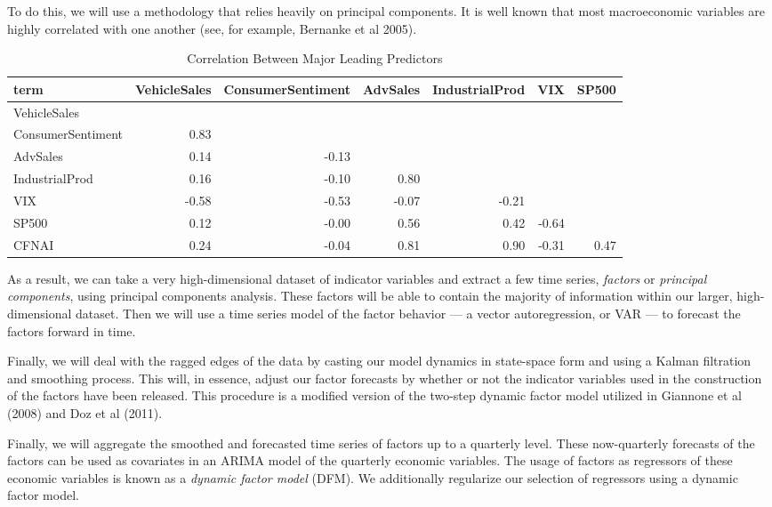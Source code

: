 \documentclass[11pt, letterpaper]{article}\usepackage[]{graphicx}\usepackage[]{color}
\begin{document}
To do this, we will use a methodology that relies heavily on principal components. It is well known that most macroeconomic variables are highly correlated with one another (see, for example, Bernanke et al 2005).
\begin{table}[H]
\centering
\begingroup\scriptsize
\begin{tabular}{lrrrrrr}
  \hline
term & VehicleSales & ConsumerSentiment & AdvSales & IndustrialProd & VIX & SP500 \\ 
  \hline
VehicleSales &  &  &  &  &  &  \\ 
  ConsumerSentiment & 0.83 &  &  &  &  &  \\ 
  AdvSales & 0.14 & -0.13 &  &  &  &  \\ 
  IndustrialProd & 0.16 & -0.10 & 0.80 &  &  &  \\ 
  VIX & -0.58 & -0.53 & -0.07 & -0.21 &  &  \\ 
  SP500 & 0.12 & -0.00 & 0.56 & 0.42 & -0.64 &  \\ 
  CFNAI & 0.24 & -0.04 & 0.81 & 0.90 & -0.31 & 0.47 \\ 
   \hline
\end{tabular}
\endgroup
\caption{Correlation Between Major Leading Predictors} 
\end{table}

As a result, we can take a very high-dimensional dataset of indicator variables and extract a few time series, \textit{factors} or \textit{principal components}, using principal components analysis. These factors will be able to contain the majority of information within our larger, high-dimensional dataset. Then we will use a time series model of the factor behavior --- a vector autoregression, or VAR --- to forecast the factors forward in time. 

Finally, we will deal with the ragged edges of the data by casting our model dynamics in state-space form and using a Kalman filtration and smoothing process. This will, in essence, adjust our factor forecasts by whether or not the indicator variables used in the construction of the factors have been released. This procedure is a modified version of the two-step dynamic factor model utilized in Giannone et al (2008) and Doz et al (2011).

Finally, we will aggregate the smoothed and forecasted time series of factors up to a quarterly level. These now-quarterly forecasts of the factors can be used as covariates in an ARIMA model of the quarterly economic variables. The usage of factors as regressors of these economic variables is known as a \textit{dynamic factor model} (DFM). We additionally regularize our selection of regressors using a dynamic factor model.
\end{document}
